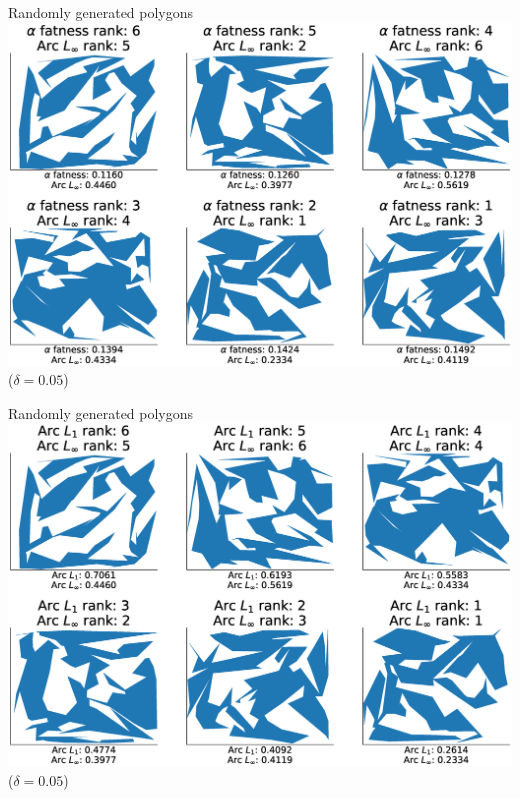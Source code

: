 \documentclass[]{beamer}
\begin{document}
\begin{frame}[t]{Randomly generated polygons} 
  \includegraphics[width=\textwidth]{../plots/u_100_alpha_score_chord_arc_infinity_vertices_0-05_delta_ranking.eps}
  ($\delta  = 0.05$)
\end{frame}

\begin{frame}[t]{Randomly generated polygons}
  \includegraphics[width=\textwidth]{../plots/u_100_chord_arc_one_chord_arc_infinity_vertices_0-05_delta_ranking.eps}
  ($\delta  = 0.05$)
\end{frame}
\end{document}
